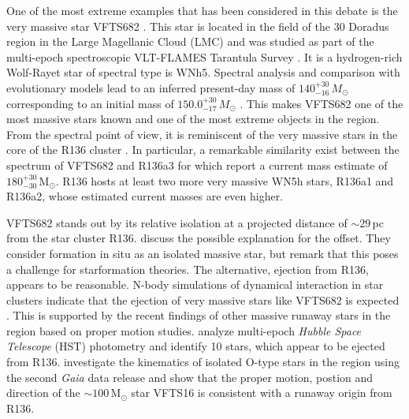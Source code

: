 \documentclass[apjl,twocolumn]{emulateapj}
\newcommand{\Msun}{{\,\mathrm{M}_\odot}}
\begin{document}
One of the most extreme examples that has been considered in this debate is the very massive star VFTS682  \cite{bestenlehner:11, bressert:12}. This star is located in the field of the 30 Doradus region in the Large Magellanic Cloud (LMC) and was studied as part of the multi-epoch spectroscopic VLT-FLAMES Tarantula Survey \citep[VFTS,][]{evans:11}. It is a hydrogen-rich Wolf-Rayet star of spectral type is WNh5. Spectral analysis and comparison with evolutionary models lead to an inferred present-day mass of $140^{+30}_{-16}\,M_\odot$ corresponding to an initial mass of $150.0^{+30}_{-17}\,M_\odot$
\citep{schneider:18}. 
%
%
This makes VFTS682 one of the most massive stars known and one of the most extreme objects in the region.
%
From the spectral point of view, it is reminiscent of the very
massive stars %
 in the core of the R136 cluster \citep{dekoter:97,crowther:10, crowther:16}. 
 In particular, a remarkable similarity exist between the
spectrum of VFTS682 and R136a3 for which \citet{crowther:16} report a
current mass estimate of $180^{+30}_{-30}\Msun$. R136 hosts
at least two more very massive WN5h stars, R136a1 and R136a2, whose
estimated current masses are even higher. 


VFTS682 stands out by its relative isolation at a projected distance of $\sim$$29$\,pc from  the star cluster R136.
\citet{bestenlehner:11} discuss the possible explanation for the offset. They consider formation in situ as an isolated massive star, but remark that this poses a challenge for starformation theories. The alternative, ejection from  R136, appears to be reasonable. N-body simulations of dynamical interaction in star clusters indicate that the ejection of very massive stars like VFTS682  is expected \citep[e.g.][]{fujii:11, banerjee:12}.  This is supported by the recent findings of other massive runaway stars in the region based on proper motion studies.   \citet{platais:15,platais:18} analyze multi-epoch \emph{Hubble Space Telescope} (HST) photometry and identify 10 stars, which appear to be ejected from R136.   \citet{lennon:18} investigate the kinematics of  isolated O-type stars in the region using the second \emph{Gaia} data release \cite[DR2,][]{gaia:16,brown:18} and show that the proper motion, postion and direction of the $\sim100\Msun$ star VFTS16 is consistent with a runaway origin from R136. 


\end{document}
